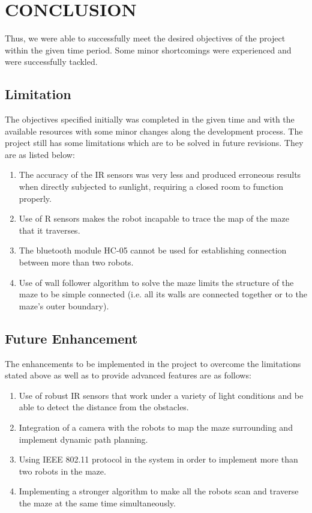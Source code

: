 \section{CONCLUSION}
Thus, we were able to successfully meet the desired objectives of the project within the given time period. Some minor shortcomings were experienced and were successfully tackled.  
\subsection{Limitation} 
The objectives specified initially was completed in the given time and with the available resources with some minor changes along the development process. The project still has some limitations which are to be solved in future revisions. They are as listed below: 
\begin{enumerate}
\item The accuracy of the IR sensors was very less and produced erroneous results when directly subjected to sunlight, requiring a closed room to function properly.
\item Use of R sensors makes the robot incapable to trace the map of the maze that it traverses.
\item The bluetooth module HC-05 cannot be used for establishing connection between more than two robots. 
\item Use of wall follower algorithm to solve the maze limits the structure of the maze to be simple connected (i.e. all its walls are connected together or to the maze's outer boundary).
\end{enumerate}
\subsection{Future Enhancement}
The enhancements to be implemented in the project to overcome the limitations stated above as well as to provide advanced features are as follows:
\begin{enumerate}
\item Use of robust IR sensors that work under a variety of light conditions and be able to detect the distance from the obstacles.
\item Integration of a camera with the robots to map the maze surrounding and implement dynamic path planning.
\item Using IEEE 802.11 protocol in the system in order to implement more than two robots in the maze.
\item Implementing a stronger algorithm to make all the robots scan and traverse the maze at the same time simultaneously.
\end{enumerate}
